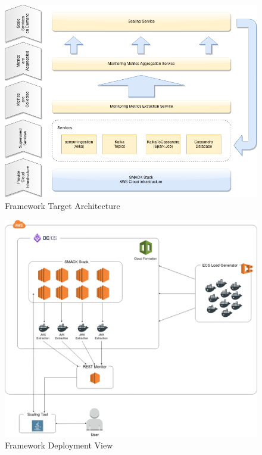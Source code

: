 \begin{figure}[!htbp]
  \centering
  \includegraphics[keepaspectratio=true,scale=0.55]{img/architecture}
    \caption{Framework Target Architecture}
    \label{fig:architecture}
\end{figure}

\begin{figure}[!htbp]
  \centering
  \includegraphics[keepaspectratio=true,scale=0.47]{img/overall_view}
    \caption{Framework Deployment View}
    \label{fig:overall_view}
\end{figure}



